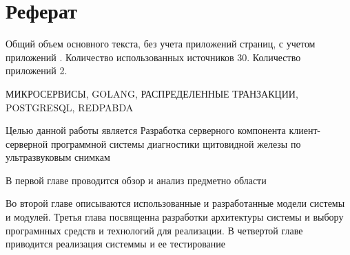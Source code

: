 \chapter*{Реферат}
\thispagestyle{plain}

Общий объем основного текста, без учета приложений \pageref{end_of_main_text} страниц, с учетом приложений \pageref{end_of_document}. Количество использованных источников 30.
Количество приложений 2.

\noindent \uppercase{микросервисы, golang, распределенные транзакции, postgresql, redpabda}

Целью данной работы является Разработка серверного компонента клиент-серверной
программной системы диагностики щитовидной железы по
ультразвуковым снимкам

В первой главе проводится обзор и анализ предметно области

Во второй главе описываются использованные и разработанные модели системы и модулей. 
Третья глава посвященна разработки архитектуры системы и выбору програмнных средств и технологий для реализации.
В четвертой главе приводится реализация системмы и ее тестирование

